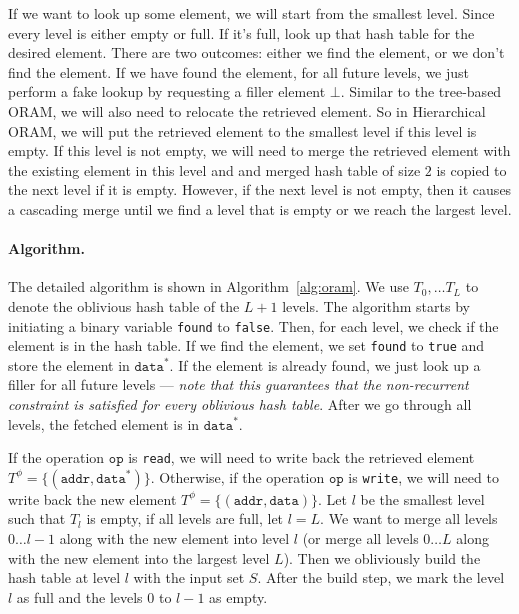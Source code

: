 If we want to look up some element, we will start from the smallest level.
Since every level is either empty or full. If it's full, 
look up that hash table for the desired element.
There are two outcomes: either we find the element, or we don't find the element.
If we have found the element, for all future levels, we just 
perform a fake lookup by requesting a filler element $\bot$.
Similar to the tree-based ORAM, 
we will also need to relocate the retrieved element.
So in Hierarchical ORAM, we will put the retrieved element 
to the smallest level if this level is empty.
If this level is not empty, we will need to merge the retrieved element with the existing element in this level and 
and merged hash table of size $2$ is copied to the next level
if it is empty. 
However, if the next level is not empty, then 
it causes a cascading merge until we find a level that is empty
or we reach the largest level.  

\paragraph{Algorithm.} The detailed algorithm is 
shown in Algorithm~\ref{alg:oram}. 
We use $T_0, \ldots T_L$ to denote the oblivious hash table
of the $L+1$ levels.
The algorithm starts by initiating a binary variable \texttt{found} to \texttt{false}.
Then, for each level, we check if the element is in the hash table. 
If we find the element, we set \texttt{found} to \texttt{true} and store the element in $\texttt{data}^*$.
If the element is already found, we just look up a filler 
for all future levels 
--- {\it note that 
this guarantees 
that the non-recurrent
constraint is satisfied for every oblivious hash table}.
After we go through all levels, 
the fetched element is in $\texttt{data}^*$.

If the operation $\texttt{op}$ is \texttt{read}, we will need to write back 
the retrieved element $T^\phi = \{(\texttt{addr}, \texttt{data}^*)\}$.
Otherwise, if the operation $\texttt{op}$ is \texttt{write}, we will need to write back the new element $T^\phi = \{(\texttt{addr}, \texttt{data})\}$.
Let $l$ be the smallest level such that $T_l$ is empty, if all levels are full, let $l = L$.
We want to merge all levels $0\ldots l-1$ along with the new element 
into level $l$ (or merge all levels $0\ldots L$ along with the new
element into the largest level $L$). 
Then we obliviously build the hash table at level $l$ with the input set $S$.
After the build step, we mark the level $l$ as 
full and the levels $0$ to $l-1$ as empty.

